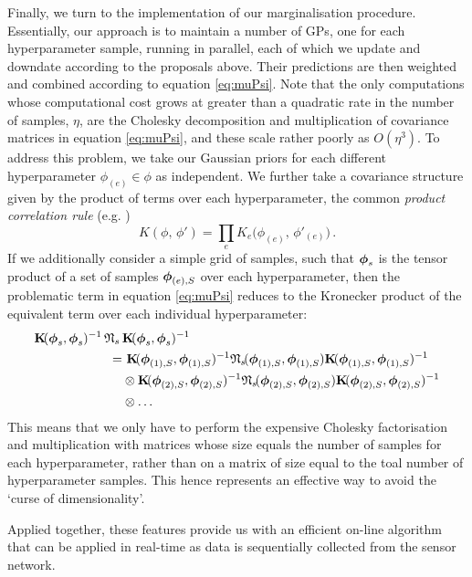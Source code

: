 \documentclass{acmtrans2m}
\begin{document}
Finally, we turn to the implementation of our marginalisation procedure. Essentially, our approach is to maintain a number of GPs, one for each hyperparameter sample, running in parallel, each of which we update and downdate according to the proposals above. Their predictions are then weighted and combined according to equation \eqref{eq:muPsi}. Note that the only computations whose computational cost grows at greater than a quadratic rate in the number of samples, $\eta$, are the Cholesky decomposition and multiplication of covariance matrices in equation \eqref{eq:muPsi}, and these scale rather poorly as $O(\eta^3)$. To address this problem, we take our Gaussian priors for each different hyperparameter $\phi_{(e)} \in \phi$ as independent. We further take a covariance structure given by the product of terms over each hyperparameter, the common \emph{product correlation rule} (e.g. )
\begin{equation}
 K(\phi,\,\phi')=\prod_e K_e\Big(\phi_{(e)},\,\phi'_{(e)}\Big)\,.
\end{equation}
If we additionally consider a simple grid of samples, such that $\boldsymbol{\phi}_s$ is the tensor product of a set of samples $\boldsymbol{\phi}_{(e),S}$ over each hyperparameter, then the problematic term in equation \eqref{eq:muPsi} reduces to the Kronecker product of the equivalent term over each individual hyperparameter:
\begin{align}\label{eq:KNK}
\mat{K} \!(\vph_s,\vph_s)^{-1}\,\Nt\,&\mat{K}\!(\vph_s,\vph_s)^{-1}\nonumber\\
 = & ~\mat{K}\!(\vph_{(1),S},\vph_{(1),S})^{-1}\Nt\!(\vph_{(1),S},\vph_{(1),S})\mat{K}\!(\vph_{(1),S},\vph_{(1),S})^{-1}\nonumber\\ & \otimes \mat{K}\!(\vph_{(2),S},\vph_{(2),S})^{-1}\Nt\!(\vph_{(2),S},\vph_{(2),S})\mat{K}\!(\vph_{(2),S},\vph_{(2),S})^{-1}\nonumber\\ & \otimes \ldots
\end{align}
This means that we only have to perform the expensive Cholesky factorisation and multiplication with matrices whose size equals the number of samples for each hyperparameter, rather than on a matrix of size equal to the toal number of hyperparameter samples. This hence represents an effective way to avoid the `curse of dimensionality'. 

Applied together, these features provide us with an efficient on-line algorithm that can be applied in real-time as data is sequentially collected from the sensor network.
\end{document}
